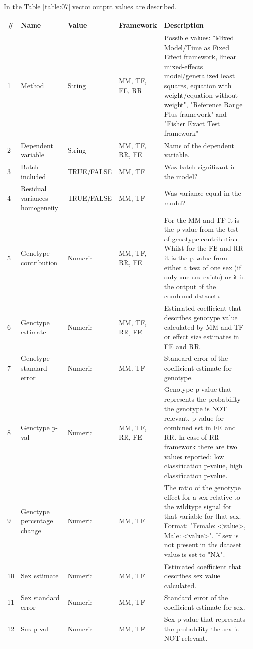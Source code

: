 \documentclass[12pt,a4paper]{article}
\begin{document}
In the Table \ref{table:07} vector output values are described.
\begin{table}
 
\begin{tabular}{| l | l | l | l | p{10cm} |}
  \hline
\#&Name&Value&Framework&Description\\\hline
1&Method&String&MM, TF, FE, RR&Possible values: "Mixed Model/Time as Fixed Effect framework, linear mixed-effects model/generalized least squares, equation with weight/equation without weight", "Reference Range Plus framework" and "Fisher Exact Test framework".\\
2&Dependent variable&String&MM, TF, RR, FE&Name of the dependent variable.\\
3&Batch included&TRUE/FALSE&MM, TF&Was batch significant in the model?\\
4&Residual variances homogeneity&TRUE/FALSE&MM, TF&Was variance equal in the model?\\
5&Genotype contribution&Numeric&MM, TF, RR, FE&For the MM and TF it is the p-value from the test of genotype contribution.  Whilst for the FE and RR it is the p-value from either a test of one sex (if only one sex exists) or it is the output of the combined datasets.\\
6&Genotype estimate&Numeric&MM, TF, RR, FE&Estimated coefficient that describes genotype value calculated by MM and TF or effect size estimates in FE and RR.\\
7&Genotype standard error&Numeric&MM, TF&Standard error of the coefficient estimate for genotype.\\
8&Genotype p-val&Numeric&MM, TF, RR, FE&Genotype p-value that represents the probability the genotype is NOT relevant. p-value for combined set in FE and RR. In case of RR framework there are two values reported: low classification p-value, high classification p-value.\\
9&Genotype percentage change&Numeric&MM, TF&The ratio of the genotype effect for a sex relative to the wildtype signal for that variable for that sex. Format: "Female: <value>, Male: <value>". If sex is not present in the dataset value is set to "NA".\\
10&Sex estimate&Numeric&MM, TF&Estimated coefficient that describes sex value calculated.\\
11&Sex standard error&Numeric&MM, TF&Standard error of the coefficient estimate for sex.\\
12&Sex p-val&Numeric&MM, TF&Sex p-value that represents the probability the sex is NOT relevant.\\

\end{tabular}
\end{table}
\end{document}
